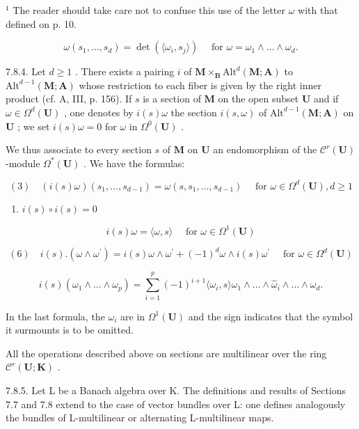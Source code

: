 \(^{1}\) The reader should take care not to confuse this use of the letter \(\omega\) with that defined on p. 10.

\[
\omega (s _ {1}, \dots , s _ {d}) = \det (\langle \omega_ {i}, s _ {j} \rangle) \quad \text {   for   } \omega = \omega_ {1} \wedge \dots \wedge \omega_ {d}.\tag{2}
\]

7.8.4. Let \(d \geqslant 1\) . There exists a pairing \(i\) of \(\mathbf{M} \times_{\mathbf{B}} \mathrm{Alt}^{d}(\mathbf{M}; \mathbf{A})\) to \(\mathrm{Alt}^{d-1}(\mathbf{M}; \mathbf{A})\) whose restriction to each fiber is given by the right inner product (cf. A, III, p. 156). If \(s\) is a section of \(\mathbf{M}\) on the open subset \(\mathbf{U}\) and if \(\omega \in \Omega^{d}(\mathbf{U})\) , one denotes by \(i(s)\omega\) the section \(i(s, \omega)\) of \(\mathrm{Alt}^{d-1}(\mathbf{M}; \mathbf{A})\) on \(\mathbf{U}\) ; we set \(i(s)\omega = 0\) for \(\omega\) in \(\Omega^{0}(\mathbf{U})\) .

We thus associate to every section \(s\) of \(\mathbf{M}\) on \(\mathbf{U}\) an endomorphism of the \(\mathcal{C}^r (\mathbf{U})\)-module \(\Omega^{*}(\mathbf{U})\) . We have the formulas:

\[
(3) \quad (i (s) \omega) (s _ {1}, \dots , s _ {d - 1}) = \omega (s, s _ {1}, \dots , s _ {d - 1}) \quad \text { for } \omega \in \Omega^ {d} (\mathbf {U}), d \geqslant 1
\]

\begin{enumerate}
\def\labelenumi{(\arabic{enumi})}
\setcounter{enumi}{3}
\tightlist
\item
  \(i(s)\circ i(s) = 0\)
\end{enumerate}

\[
i (s) \omega = \langle \omega , s \rangle \quad \text { for } \omega \in \Omega^ {1} (\mathbf {U}) \tag {5}
\]

\[
(6) \quad i (s). (\omega \wedge \omega^ {\prime}) = i (s) \omega \wedge \omega^ {\prime} + (- 1) ^ {d} \omega \wedge i (s) \omega^ {\prime} \quad \text { for } \omega \in \Omega^ {d} (\mathbf {U})
\]

\[
i (s) (\omega_ {1} \wedge \dots \wedge \omega_ {p}) = \sum_ {i = 1} ^ {p} (- 1) ^ {i + 1} \langle \omega_ {i}, s \rangle \omega_ {1} \wedge \dots \wedge \hat {\omega} _ {i} \wedge \dots \wedge \omega_ {d}.\tag{7}
\]

In the last formula, the \(\omega_{i}\) are in \(\Omega^{1}(\mathbf{U})\) and the sign indicates that the symbol it surmounts is to be omitted.

All the operations described above on sections are multilinear over the ring \(\mathcal{C}^r (\mathbf{U};\mathbf{K})\) .

7.8.5. Let L be a Banach algebra over K. The definitions and results of Sections 7.7 and 7.8 extend to the case of vector bundles over L: one defines analogously the bundles of L-multilinear or alternating L-multilinear maps.


